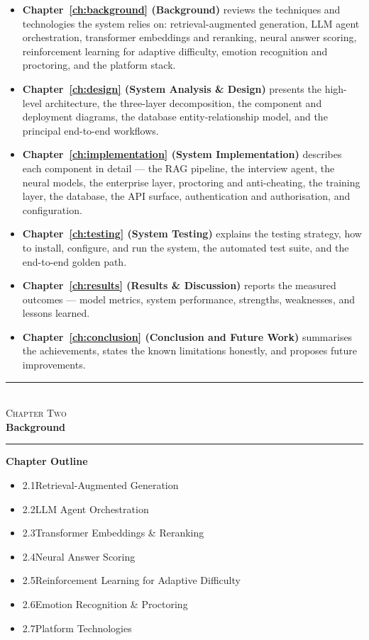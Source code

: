 \documentclass[12pt,a4paper,oneside]{report}
\newcommand{\chapterfrontpage}[3]{%
  \clearpage
  \thispagestyle{empty}
  \vspace*{4cm}
  \begin{center}
    \textcolor{ainshams}{\rule{0.6\linewidth}{1.5pt}}\\[0.6cm]
    {\LARGE\textsc{#1}}\\[0.8cm]
    {\Huge\bfseries #2}\\[0.6cm]
    \textcolor{ainshams}{\rule{0.6\linewidth}{1.5pt}}
  \end{center}
  \vspace{1.8cm}
  \begin{center}
    \begin{minipage}{0.72\linewidth}
      \textbf{\large Chapter Outline}\\[6pt]
      \begin{itemize}[leftmargin=1.4em]
        #3
      \end{itemize}
    \end{minipage}
  \end{center}
  \clearpage
}
\begin{document}
\begin{itemize}
  \item \textbf{Chapter~\ref{ch:background} (Background)} reviews the techniques and
    technologies the system relies on: retrieval-augmented generation, LLM agent
    orchestration, transformer embeddings and reranking, neural answer scoring, reinforcement
    learning for adaptive difficulty, emotion recognition and proctoring, and the platform
    stack.
  \item \textbf{Chapter~\ref{ch:design} (System Analysis \& Design)} presents the high-level
    architecture, the three-layer decomposition, the component and deployment diagrams, the
    database entity-relationship model, and the principal end-to-end workflows.
  \item \textbf{Chapter~\ref{ch:implementation} (System Implementation)} describes each
    component in detail --- the RAG pipeline, the interview agent, the neural models, the
    enterprise layer, proctoring and anti-cheating, the training layer, the database, the API
    surface, authentication and authorisation, and configuration.
  \item \textbf{Chapter~\ref{ch:testing} (System Testing)} explains the testing strategy, how
    to install, configure, and run the system, the automated test suite, and the end-to-end
    golden path.
  \item \textbf{Chapter~\ref{ch:results} (Results \& Discussion)} reports the measured
    outcomes --- model metrics, system performance, strengths, weaknesses, and lessons learned.
  \item \textbf{Chapter~\ref{ch:conclusion} (Conclusion and Future Work)} summarises the
    achievements, states the known limitations honestly, and proposes future improvements.
\end{itemize}

\chapterfrontpage{Chapter Two}{Background}{%
  \item 2.1\quad Retrieval-Augmented Generation
  \item 2.2\quad LLM Agent Orchestration
  \item 2.3\quad Transformer Embeddings \& Reranking
  \item 2.4\quad Neural Answer Scoring
  \item 2.5\quad Reinforcement Learning for Adaptive Difficulty
  \item 2.6\quad Emotion Recognition \& Proctoring
  \item 2.7\quad Platform Technologies
}
\end{document}
